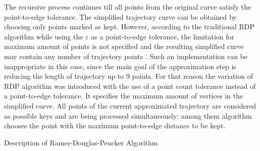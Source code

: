 The recursive process continues till all points from the original curve satisfy the point-to-edge tolerance. The simplified trajectory curve can be obtained by choosing only points marked as kept. However, according to the traditional RDP algorithm while using the $\varepsilon$ as a point-to-edge tolerance, the limitation for maximum amount of points is not specified and the resulting simplified curve may contain any number of trajectory points \cite{online:rdp_algo_var}. Such an implementation can be inappropriate in this case, since the main goal of the approximation step is reducing the length of trajectory up to 9 points. For that reason the variation of RDP algorithm was introduced with the use of a point count tolerance instead of a point-to-edge tolerance. It specifies the maximum amount of vertices in the simplified curve. All points of the current approximated trajectory are considered as possible keys and are being processed simultaneously: among them algorithm chooses the point with the maximum point-to-edge distance to be kept.

\begin{algorithm}[!htb]
	\caption{Description of Ramer-Douglas-Peucker Algorithm}
	\label{algo:rdp-algo}
	\SetAlgoLined
\end{algorithm}

